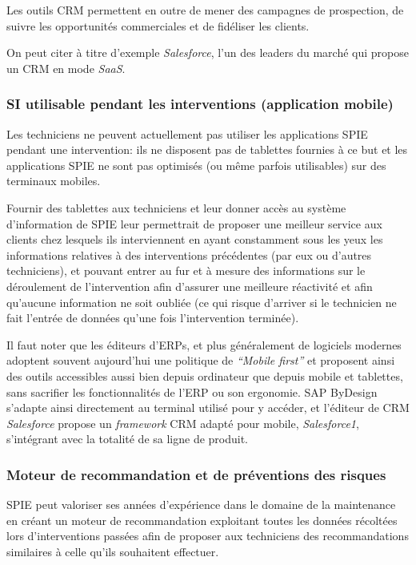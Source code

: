            Les outils CRM permettent en outre de mener des campagnes de prospection, de suivre les opportunités commerciales et de fidéliser les clients.

            On peut citer à titre d'exemple \textit{Salesforce}, l'un des leaders du marché qui propose un CRM en mode \textit{SaaS}.

        \subsubsection{SI utilisable pendant les interventions (application mobile)}

            Les techniciens ne peuvent actuellement pas utiliser les applications SPIE pendant une intervention: ils ne disposent pas de tablettes fournies à ce but et les applications SPIE ne sont pas optimisés (ou même parfois utilisables) sur des terminaux mobiles.

            Fournir des tablettes aux techniciens et leur donner accès au système d'information de SPIE leur permettrait de proposer une meilleur service aux clients chez lesquels ils interviennent en ayant constamment sous les yeux les informations relatives à des interventions précédentes (par eux ou d'autres techniciens), et pouvant entrer au fur et à mesure des informations sur le déroulement de l'intervention afin d'assurer une meilleure réactivité et afin qu'aucune information ne soit oubliée (ce qui risque d'arriver si le technicien ne fait l'entrée de données qu'une fois l'intervention terminée).

            Il faut noter que les éditeurs d'ERPs, et plus généralement de logiciels modernes adoptent souvent aujourd'hui une politique de \textit{``Mobile first''} et proposent ainsi des outils accessibles aussi bien depuis ordinateur que depuis mobile et tablettes, sans sacrifier les fonctionnalités de l'ERP ou son ergonomie. SAP ByDesign s'adapte ainsi directement au terminal utilisé pour y accéder, et l'éditeur de CRM \textit{Salesforce} propose un \textit{framework} CRM adapté pour mobile, \textit{Salesforce1}, s'intégrant avec la totalité de sa ligne de produit.


        \subsubsection{Moteur de recommandation et de préventions des risques}

            SPIE peut valoriser ses années d'expérience dans le domaine de la maintenance en créant un moteur de recommandation exploitant toutes les données récoltées lors d'interventions passées afin de proposer aux techniciens des recommandations similaires à celle qu'ils souhaitent effectuer.

